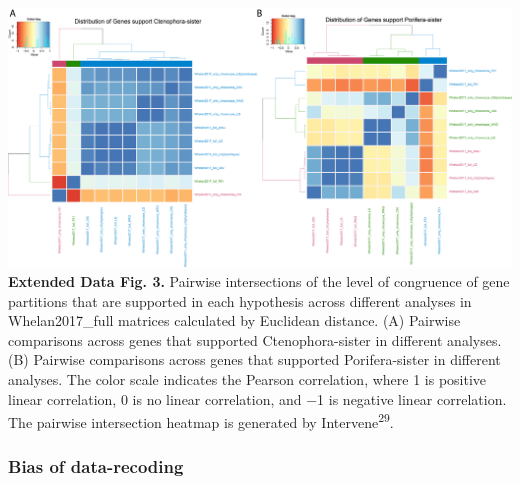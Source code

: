 \documentclass[]{article}
\begin{document}
\includegraphics{figures/Figure_Pairwise_heatmap_animal_root.png}
\textbf{Extended Data Fig. 3.} Pairwise intersections of the level of
congruence of gene partitions that are supported in each hypothesis
across different analyses in Whelan2017\_full matrices calculated by
Euclidean distance. (A) Pairwise comparisons across genes that supported
Ctenophora-sister in different analyses. (B) Pairwise comparisons across
genes that supported Porifera-sister in different analyses. The color
scale indicates the Pearson correlation, where 1 is positive linear
correlation, 0 is no linear correlation, and −1 is negative linear
correlation. The pairwise intersection heatmap is generated by
Intervene\textsuperscript{29}.

\hypertarget{bias-of-data-recoding}{%
\subsubsection{Bias of data-recoding}\label{bias-of-data-recoding}}
\end{document}
